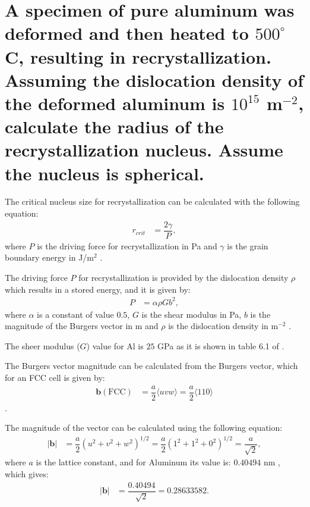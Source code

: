 \newpage
\section{A specimen of pure aluminum was deformed and then heated to $500^{\circ}$C, resulting in recrystallization. Assuming the dislocation density of the deformed aluminum is $10^{15}$ m$^{-2}$, calculate the radius of the recrystallization nucleus. Assume the nucleus is spherical.}

The critical nucleus size for recrystallization can be calculated with the following equation:
\begin{align}
    \label{eq:r_recrystallization}
    r_{crit}&=\dfrac{2\gamma}{P},
\end{align}
where $P$ is the driving force for recrystallization in Pa and $\gamma$ is the grain boundary energy in J/m$^2$ \citep[p.~283]{rollett2017recrystallization}.

The driving force $P$ for recrystallization is provided by the dislocation density $\rho$ which results in a stored energy, and it is given by:
\begin{align}
    \label{eq:drivin_force}
    P&=\alpha \rho Gb^2,
\end{align}
where $\alpha$ is a constant of value $0.5$, $G$ is the shear modulus in Pa, $b$ is the magnitude of the Burgers vector in m and $\rho$ is the dislocation density in m$^{-2}$ \citep[p.~249]{rollett2017recrystallization}.

The sheer modulus ($G$) value for Al is $25$ GPa as it is shown in table 6.1 of \citet[p.~157]{callister2010materials}.

The Burgers vector magnitude can be calculated from the Burgers vector, which for an FCC cell is given by:
\begin{align}
    \label{eq:fcc_vector}
    \mathbf{b}(\text{FCC})&=\dfrac{a}{2}\langle uvw\rangle=\dfrac{a}{2}\langle110\rangle
\end{align}
\citep[p.~204]{callister2010materials}.

The magnitude of the vector can be calculated using the following equation:
\begin{align}
    \label{eq:vector_magnitude}
    \left|\mathbf{b}\right|&=\dfrac{a}{2}\left(u^{2}+v^{2}+w^{2}\right)^{1/2}=\dfrac{a}{2}\left(1^{2}+1^{2}+0^{2}\right)^{1/2}=\dfrac{a}{\sqrt{2}},
\end{align}
where $a$ is the lattice constant, and for Aluminum its value is: $0.40494$ nm \citep{Xu2011}, which gives:
\begin{align}
    \label{eq:vector_magnitude01}
    \left|\mathbf{b}\right|&=\dfrac{0.40494}{\sqrt{2}}=0.28633582.
\end{align}

